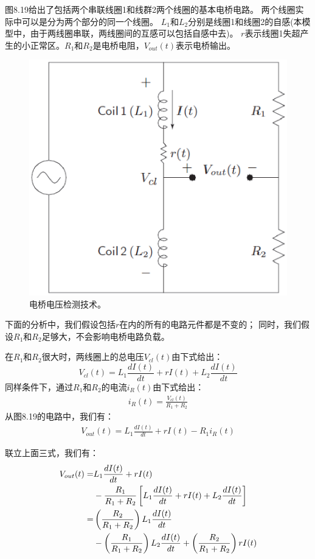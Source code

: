 图8.19给出了包括两个串联线圈1和线群2两个线圈的基本电桥电路。
两个线圈实际中可以是分为两个部分的同一个线圈。
$L_1$和$L_2$分别是线圈1和线圈2的自感(本模型中，由于两线圈串联，两线圈间的互感可以包括自感中去)。
$r$表示线圈1失超产生的小正常区。$R_1$和$R_2$是电桥电阻，$V_{out}(t)$表示电桥输出。

\begin{figure}
	\centering
	\includegraphics[scale=0.6]{chpt8/figs/fig8.19.eps}
	\caption{电桥电压检测技术。}
\end{figure}

下面的分析中，我们假设包括$r$在内的所有的电路元件都是不变的；
同时，我们假设$R_1$和$R_2$足够大，不会影响电桥电路负载。

在$R_1$和$R_2$很大时，两线圈上的总电压$V_{cl}(t)$由下式给出：
\begin{equation}%
V_{cl}(t)=L_1\frac{dI(t)}{dt}+rI(t)+L_2\frac{dI(t)}{dt}
\end{equation}
同样条件下，通过$R_1$和$R_2$的电流$i_R(t)$由下式给出：
\begin{align*}%
i_R(t)=\frac{V_{cl}(t)}{R_1+R_2} \tag{8.67b}
\end{align*}
从图8.19的电路中，我们有：
\begin{align*}%
V_{out}(t)=L_1\frac{dI(t)}{dt}+rI(t)-R_1i_R(t) \tag{8.67c}
\end{align*}

联立上面三式，我们有：
\begin{align}%
V_{out}(t)=&L_1\frac{dI(t)}{dt}+rI(t) \\
&-\frac{R_1}{R_1+R_2}\left[L_1\frac{dI(t)}{dt}+rI(t)+L_2\frac{dI(t)}{dt}\right] \\\notag
=&\left(\frac{R_2}{R_1+R_2}\right)L_1\frac{dI(t)}{dt} \\
&-\left(\frac{R_1}{R_1+R_2}\right)L_2\frac{dI(t)}{dt}+\left(\frac{R_2}{R_1+R_2}\right)rI(t)
\end{align}

